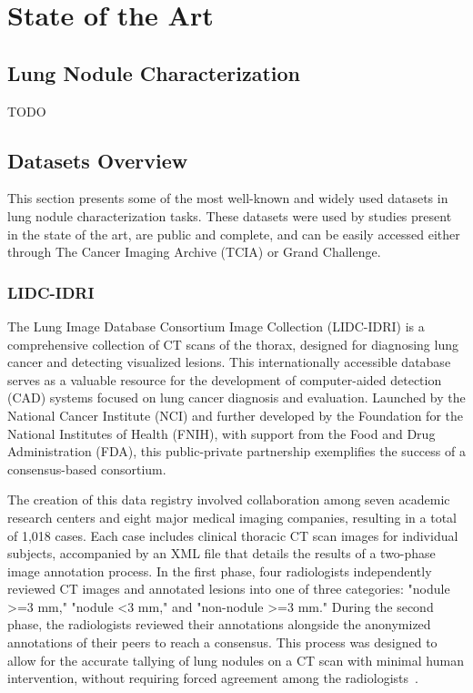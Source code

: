 \chapter{State of the Art}\label{chap:sota}

\section{Lung Nodule Characterization}

TODO


\section{Datasets Overview}
This section presents some of the most well-known and widely used datasets in lung nodule characterization tasks. These datasets were used by studies present in the state of the art, are public and complete, and can be easily accessed either through The Cancer Imaging Archive (TCIA) or Grand Challenge.

\subsection{LIDC-IDRI}\label{lidc}
The Lung Image Database Consortium Image Collection (LIDC-IDRI) is a comprehensive collection of CT scans of the thorax, designed for diagnosing lung cancer and detecting visualized lesions. This internationally accessible database serves as a valuable resource for the development of computer-aided detection (CAD) systems focused on lung cancer diagnosis and evaluation. Launched by the National Cancer Institute (NCI) and further developed by the Foundation for the National Institutes of Health (FNIH), with support from the Food and Drug Administration (FDA), this public-private partnership exemplifies the success of a consensus-based consortium.

The creation of this data registry involved collaboration among seven academic research centers and eight major medical imaging companies, resulting in a total of 1,018 cases. Each case includes clinical thoracic CT scan images for individual subjects, accompanied by an XML file that details the results of a two-phase image annotation process. In the first phase, four radiologists independently reviewed CT images and annotated lesions into one of three categories: "nodule >=3 mm," "nodule <3 mm," and "non-nodule >=3 mm." During the second phase, the radiologists reviewed their annotations alongside the anonymized annotations of their peers to reach a consensus. This process was designed to allow for the accurate tallying of lung nodules on a CT scan with minimal human intervention, without requiring forced agreement among the radiologists~\cite{Armato2015}.

